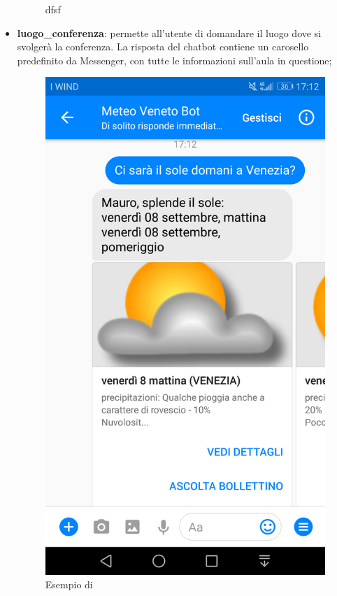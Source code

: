 \begin{itemize}
\begin{figure}[h]
		\caption{dfsf}
	\end{figure}
	\item \textbf{luogo\_conferenza}: permette all'utente di domandare il luogo dove si svolgerà la conferenza. La risposta del \gls{chatbot} contiene un carosello predefinito da Messenger, con tutte le informazioni sull'aula in questione;
	\begin{figure}[h!]
		\centering
		\includegraphics[scale=0.12]{../Immagini/richiesta_sole.png}
		\caption{Esempio di }

\end{figure}
\end{itemize}
